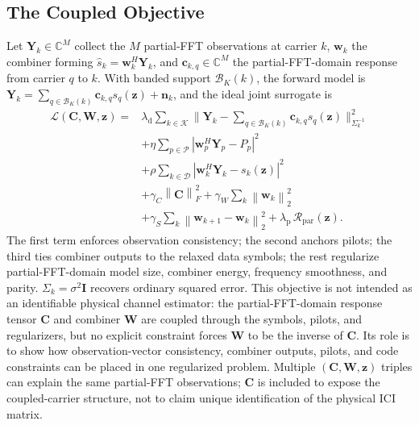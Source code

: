\documentclass[journal]{IEEEtran}
\newcommand{\C}{\mathbb{C}}
\newcommand{\Ht}{^{H}}
\newcommand{\norm}[1]{\left\lVert #1 \right\rVert}
\newcommand{\abs}[1]{\left\lvert #1 \right\rvert}
\begin{document}
\subsection{The Coupled Objective}\label{ssec:juna-objective}
Let $\mathbf Y_k\in\C^M$ collect the $M$ partial-FFT observations at
carrier $k$, $\mathbf w_k$ the combiner forming $\widehat s_k=\mathbf
w_k\Ht\mathbf Y_k$, and $\mathbf c_{k,q}\in\C^M$ the partial-FFT-domain response from carrier
$q$ to $k$. With banded support $\mathcal B_K(k)$, the forward model is $\mathbf
Y_k=\sum_{q\in\mathcal B_K(k)}\mathbf c_{k,q}s_q(\mathbf z)+\mathbf n_k$, and
the ideal joint surrogate is
\begin{equation}
  \begin{aligned}
    \mathcal L(\mathbf C,\mathbf W,\mathbf z)
    ={}&\lambda_{\mathrm d}\sum_{k\in\mathcal K}
        \Big\|\mathbf Y_k-\sum_{q\in\mathcal B_K(k)}
        \mathbf c_{k,q}s_q(\mathbf z)\Big\|_{\Sigma_k^{-1}}^2\\
    &+\eta\sum_{p\in\mathcal P}\abs{\mathbf w_p\Ht\mathbf Y_p-P_p}^2\\
    &+\rho\sum_{k\in\mathcal D}
      \abs{\mathbf w_k\Ht\mathbf Y_k-s_k(\mathbf z)}^2\\
    &+\gamma_C\norm{\mathbf C}_F^2+\gamma_W\sum_{k}\norm{\mathbf w_k}_2^2\\
    &+\gamma_S\sum_{k}\norm{\mathbf w_{k+1}-\mathbf w_k}_2^2
      +\lambda_{\mathrm p}\,\mathcal R_{\mathrm{par}}(\mathbf z).
  \end{aligned}
  \label{eq:juna-total}
\end{equation}
The first term enforces observation consistency; the second anchors pilots; the
third ties combiner outputs to the relaxed data symbols; the rest regularize
partial-FFT-domain model size, combiner energy, frequency smoothness, and parity.
$\Sigma_k=\sigma^2\mathbf I$ recovers ordinary squared error. This objective is
not intended as an identifiable physical channel estimator: the partial-FFT-domain response
tensor $\mathbf C$ and combiner $\mathbf W$ are coupled through the symbols,
pilots, and regularizers, but no explicit constraint forces $\mathbf W$ to be the
inverse of $\mathbf C$. Its role is to show how observation-vector consistency, combiner
outputs, pilots, and code constraints can be placed in one regularized problem.
Multiple $(\mathbf C,\mathbf W,\mathbf z)$ triples can explain the same partial-FFT
observations; $\mathbf C$ is included to expose the coupled-carrier structure,
not to claim unique identification of the physical ICI matrix.
\end{document}
